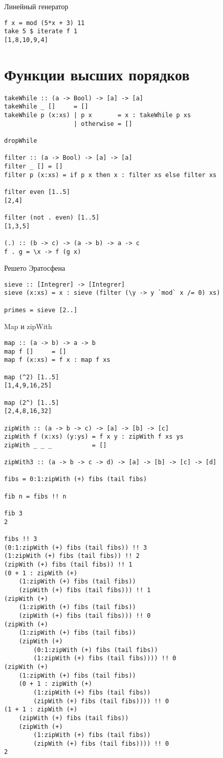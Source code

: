\documentclass[a4paper,10pt]{article}
\begin{document}
Линейный генератор 
\begin{lstlisting}
f x = mod (5*x + 3) 11
take 5 $ iterate f 1
[1,8,10,9,4]
\end{lstlisting}

\section{Функции высших порядков}

\begin{lstlisting}
takeWhile :: (a -> Bool) -> [a] -> [a]
takeWhile _ []     = []
takeWhile p (x:xs) | p x       = x : takeWhile p xs
                   | otherwise = []

dropWhile

filter :: (a -> Bool) -> [a] -> [a]
filter _ [] = []
filter p (x:xs) = if p x then x : filter xs else filter xs

filter even [1..5]
[2,4]

filter (not . even) [1..5]
[1,3,5]

(.) :: (b -> c) -> (a -> b) -> a -> c
f . g = \x -> f (g x)
\end{lstlisting}

Решето Эратосфена

\begin{lstlisting}
sieve :: [Integrer] -> [Integrer]
sieve (x:xs) = x : sieve (filter (\y -> y `mod` x /= 0) xs)

primes = sieve [2..]
\end{lstlisting}

Map и zipWith

\begin{lstlisting}
map :: (a -> b) -> a -> b
map f []     = []
map f (x:xs) = f x : map f xs

map (^2) [1..5]
[1,4,9,16,25]

map (2^) [1..5]
[2,4,8,16,32]

zipWith :: (a -> b -> c) -> [a] -> [b] -> [c]
zipWith f (x:xs) (y:ys) = f x y : zipWith f xs ys
zipWith _ _ _           = []

zipWith3 :: (a -> b -> c -> d) -> [a] -> [b] -> [c] -> [d]

fibs = 0:1:zipWith (+) fibs (tail fibs)

fib n = fibs !! n

fib 3
2

fibs !! 3
(0:1:zipWith (+) fibs (tail fibs)) !! 3
(1:zipWith (+) fibs (tail fibs)) !! 2
(zipWith (+) fibs (tail fibs)) !! 1
(0 + 1 : zipWith (+)
    (1:zipWith (+) fibs (tail fibs))
    (zipWith (+) fibs (tail fibs))) !! 1
(zipWith (+)
    (1:zipWith (+) fibs (tail fibs))
    (zipWith (+) fibs (tail fibs))) !! 0
(zipWith (+)
    (1:zipWith (+) fibs (tail fibs))
    (zipWith (+)
        (0:1:zipWith (+) fibs (tail fibs))
        (1:zipWith (+) fibs (tail fibs)))) !! 0
(zipWith (+)
    (1:zipWith (+) fibs (tail fibs))
    (0 + 1 : zipWith (+)
        (1:zipWith (+) fibs (tail fibs))
        (zipWith (+) fibs (tail fibs)))) !! 0
(1 + 1 : zipWith (+)
    (zipWith (+) fibs (tail fibs))
    (zipWith (+)
        (1:zipWith (+) fibs (tail fibs))
        (zipWith (+) fibs (tail fibs)))) !! 0
2


\end{lstlisting}
\end{document}
